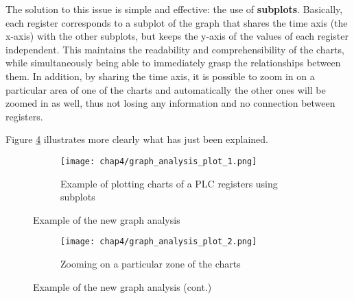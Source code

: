 \bigskip
The solution to this issue is simple and effective: the use of \textbf{subplots}. Basically, each register corresponds to a subplot of the graph that shares the time axis (the x-axis) with the other subplots, but keeps the y-axis of the values of each register independent. This maintains the readability and comprehensibility of the charts, while simultaneously being able to immediately grasp the relationships between them. In addition, by sharing the time axis, it is possible to zoom in on a particular area of one of the charts and automatically the other ones will be zoomed in as well, thus not losing any information and no connection between registers. 

\bigskip
\noindent Figure \ref{fig:4_graph_analysis} illustrates more clearly what has just been explained. %

\begin{figure}[H]
	\centering
	\begin{subfigure}{0.9\textwidth}
		\texttt{[image: chap4/graph\_analysis\_plot\_1.png]}
		\caption{Example of plotting charts of a PLC registers using subplots}
		\label{subfig:4_graph_analysis_1}
	\end{subfigure}
	\hfill
	\caption{Example of the new graph analysis}
\end{figure}
\begin{figure}[H]\ContinuedFloat
	\begin{subfigure}{0.9\textwidth}
		\texttt{[image: chap4/graph\_analysis\_plot\_2.png]}
		\caption{Zooming on a particular zone of the charts}
		\label{subfig:4_graph_analysis_2}
	\end{subfigure}
	\caption{Example of the new graph analysis (cont.)}
	\label{fig:4_graph_analysis}
\end{figure}


	
